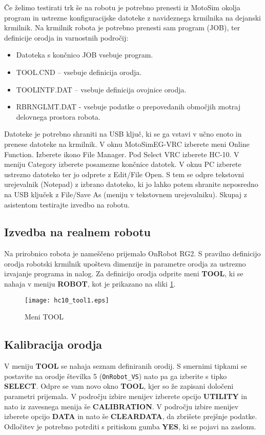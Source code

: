 Če želimo testirati trk še na robotu je potrebno prenesti iz MotoSim okolja program in ustrezne konfiguracijske datoteke z navideznega krmilnika na dejanski krmilnik. Na krmilnik robota je potrebno prenesti sam program (JOB), ter definicije orodja in varnostnih področij:
\begin{itemize}
\item Datoteka s končnico JOB vsebuje program.
\item TOOL.CND – vsebuje definicija orodja.
\item TOOLINTF.DAT – vsebuje definicija ovojnice orodja.
\item RBRNGLMT.DAT - vsebuje podatke o prepovedanih območjih znotraj delovnega prostora robota.
\end{itemize}
	
Datoteke je potrebno shraniti na USB ključ, ki se ga vstavi v učno enoto in prenese datoteke na krmilnik. V oknu MotoSimEG-VRC izberete meni Online Function. Izberete ikono File Manager. Pod Select VRC izberete HC-10. V meniju Category izberete posamezne končnice datotek. V oknu PC izberete ustrezno datoteko ter jo odprete z Edit/File Open. S tem se odpre tekstovni urejevalnik (Notepad) z izbrano datoteko, ki jo lahko potem shranite neposredno na USB ključek z File/Save As (meniju v tekstovnem urejevalniku). Skupaj z asistentom testirajte izvedbo na robotu.

\subsection{Izvedba na realnem robotu}

Na prirobnico robota je nameščeno prijemalo OnRobot RG2. S pravilno definicijo orodja robotski krmilnik upošteva dimenzije in parametre orodja za ustrezno izvajanje programa in nalog. Za definicijo orodja odprite meni \textbf{TOOL}, ki se nahaja v meniju \textbf{ROBOT}, kot je prikazano na sliki \ref{fig:hc10_tool1}.

\begin{figure}[!hbt]
	\centering
	\texttt{[image: hc10\_tool1.eps]}
	\caption{Meni TOOL}
	\label{fig:hc10_tool1}
\end{figure}

\subsection*{Kalibracija orodja}

V meniju \textbf{TOOL} se nahaja seznam definiranih orodij. S smernimi tipkami se postavite na orodje številka 5 (\verb"OnRobot_VS") nato pa ga izberite s tipko \textbf{SELECT}. Odpre se vam novo okno \textbf{TOOL}, kjer so že zapisani določeni parametri prijemala. V področju izbire menijev izberete opcijo \textbf{UTILITY} in nato iz zavesnega menija še \textbf{CALIBRATION}. V področju izbire menijev izberete opcijo \textbf{DATA} in nato še \textbf{CLEARDATA}, da zbrišete prejšnje podatke. Odločitev je potrebno potrditi s pritiskom gumba \textbf{YES}, ki se pojavi na zaslonu.

